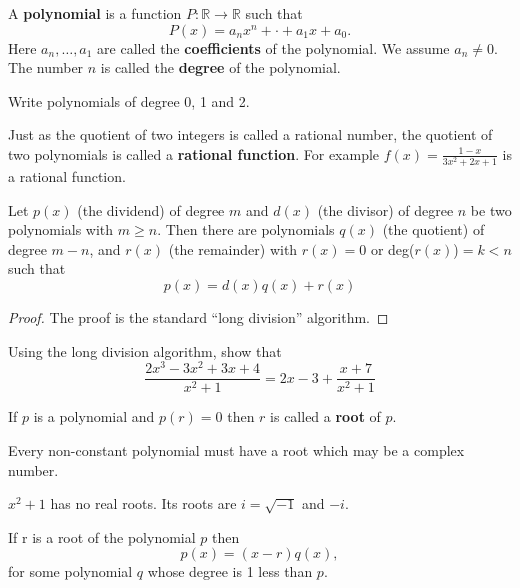 \documentclass[../calc1-main.tex]{subfiles}
\begin{document}
\begin{definition}
  A \textbf{polynomial} is a function $P: \mathbb{R} \to \mathbb{R}$ such that
  \[
    P(x) = a_n x^n + \cdot + a_1 x + a_0.
  \]
  Here $a_n, \dots, a_1$ are called the \textbf{coefficients} of the polynomial. We assume $a_n \neq 0$. The number $n$ is called the \textbf{degree} of the polynomial.
\end{definition}

\begin{example}
  Write polynomials of degree 0, 1 and 2.
\end{example}

Just as the quotient of two integers is called a rational number, the quotient of two polynomials is called a \textbf{rational function}. For example $f(x) = \frac{1-x}{3x^2 + 2x + 1}$ is a rational function.

\begin{theorem}
  Let $p(x)$ (the dividend) of degree $m$ and $d(x)$ (the divisor) of degree $n$ be two polynomials with $m\ge n$.
  Then there are polynomials $q(x)$ (the quotient) of degree $m-n$, and $r(x)$ (the remainder) with $r(x) = 0$ or deg($r(x)$)$=k<n$ such that
  \[
    p(x) = d(x) q(x) + r(x)
  \]
\end{theorem}
\begin{proof}
  The proof is the standard ``long division'' algorithm.
\end{proof}

\begin{example}
  Using the long division algorithm, show that
  \[
    \frac{2x^3-3x^2+3x+4}{x^2+1} = 2x-3 + \frac{x+7}{x^2+1}
  \]
\end{example}

If $p$ is a polynomial and $p(r) = 0$ then $r$ is called a \textbf{root} of $p$.

\begin{theorem}
   Every non-constant polynomial must have a root which may be a complex number.
\end{theorem}

\begin{example}
  $x^2+1$ has no real roots. Its roots are $i=\sqrt{-1}$ and $-i$.
\end{example}

\begin{theorem}
  If r is a root of the polynomial $p$ then
  \[
    p(x) = (x-r) q(x),
  \]
  for some polynomial $q$ whose degree is 1 less than $p$.
\end{theorem}
\end{document}
